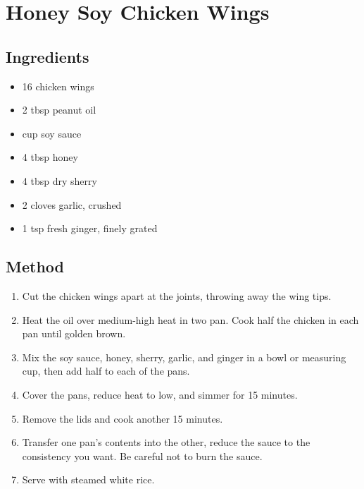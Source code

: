 \section{Honey Soy Chicken Wings}
  \begin{multicols}{2}
    \subsection{Ingredients}
      \begin{itemize}
        \item 16 chicken wings
        \item 2 tbsp peanut oil
        \item {} cup soy sauce
        \item 4 tbsp honey
        \item 4 tbsp dry sherry
        \item 2 cloves garlic, crushed
        \item 1 tsp fresh ginger, finely grated
      \end{itemize}
      \vfill\null
    \columnbreak
    \subsection{Method}
      \begin{enumerate}
        \item Cut the chicken wings apart at the joints, throwing away the wing tips.
        \item Heat the oil over medium-high heat in two pan. Cook half the chicken in each pan until golden brown.
        \item Mix the soy sauce, honey, sherry, garlic, and ginger in a bowl or measuring cup, then add half to each of the pans.
        \item Cover the pans, reduce heat to low, and simmer for 15 minutes.
        \item Remove the lids and cook another 15 minutes.
        \item Transfer one pan's contents into the other, reduce the sauce to the consistency you want. Be careful not to burn the sauce.
        \item Serve with steamed white rice.
      \end{enumerate}
  \end{multicols}
